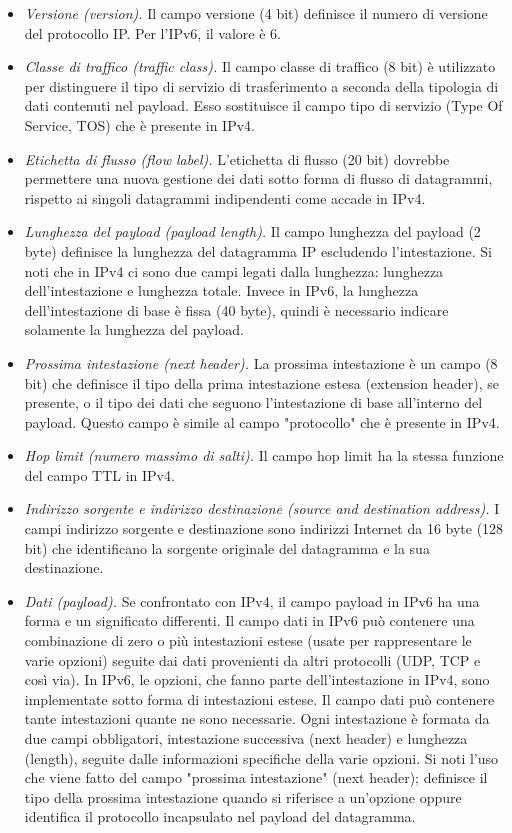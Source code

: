 \begin{itemize}
    \item \textit{Versione (version).} Il campo versione (4 bit) definisce il numero di versione del protocollo IP. Per l'IPv6, il valore è 6.
    \item \textit{Classe di traffico (traffic class).} Il campo classe di traffico (8 bit) è utilizzato per distinguere il tipo di servizio di trasferimento a seconda della tipologia di dati contenuti nel payload. Esso sostituisce il campo tipo di servizio (Type Of Service, TOS) che è presente in IPv4.
    \item \textit{Etichetta di flusso (flow label).} L'etichetta di flusso (20 bit) dovrebbe permettere una nuova gestione dei dati sotto forma di flusso di datagrammi, rispetto ai singoli datagrammi indipendenti come accade in IPv4.
    \item \textit{Lunghezza del payload (payload length).} Il campo lunghezza del payload (2 byte) definisce la lunghezza del datagramma IP escludendo l'intestazione. Si noti che in IPv4 ci sono due campi legati dalla lunghezza: lunghezza dell'intestazione e lunghezza totale. Invece in IPv6, la lunghezza dell'intestazione di base è fissa (40 byte), quindi è necessario indicare solamente la lunghezza del payload.
    \item \textit{Prossima intestazione (next header).} La prossima intestazione è un campo (8 bit) che definisce il tipo della prima intestazione estesa (extension header), se presente, o il tipo dei dati che seguono l'intestazione di base all'interno del payload. Questo campo è simile al campo "protocollo" che è presente in IPv4.
    \item \textit{Hop limit (numero massimo di salti).} Il campo hop limit ha la stessa funzione del campo TTL in IPv4.
    \item \textit{Indirizzo sorgente e indirizzo destinazione (source and destination address).} I campi indirizzo sorgente e destinazione sono indirizzi Internet da 16 byte (128 bit) che identificano la sorgente originale del datagramma e la sua destinazione.
    \item \textit{Dati (payload).} Se confrontato con IPv4, il campo payload in IPv6 ha una forma e un significato differenti. Il campo dati in IPv6 può contenere una combinazione di zero o più intestazioni estese (usate per rappresentare le varie opzioni) seguite dai dati provenienti da altri protocolli (UDP, TCP e così via). In IPv6, le opzioni, che fanno parte dell'intestazione in IPv4, sono implementate sotto forma di intestazioni estese. Il campo dati può contenere tante intestazioni quante ne sono necessarie. Ogni intestazione è formata da due campi obbligatori, intestazione successiva (next header) e lunghezza (length), seguite dalle informazioni specifiche della varie opzioni. Si noti l'uso che viene fatto del campo "prossima intestazione" (next header); definisce il tipo della prossima intestazione quando si riferisce a un'opzione oppure identifica il protocollo incapsulato nel payload del datagramma.
\end{itemize}

